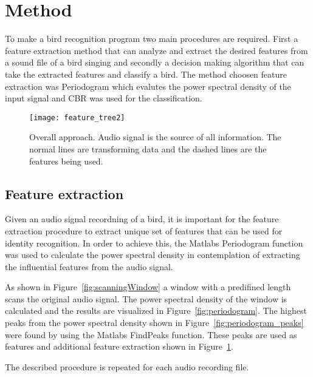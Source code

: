 \section{Method}
To make a bird recognition program two main procedures are required. First a feature
extraction method that can analyze and extract the desired features from a
sound file of a bird singing and secondly a decision making algorithm that can
take the extracted features and classify a bird. The method choosen feature
extraction was Periodogram which evalutes the power spectral density of the
input signal and CBR was used for the classification.

\begin{figure}[h]
\centering
\texttt{[image: feature\_tree2]}
\caption{Overall approach. Audio signal is the source of all information. The normal lines are transforming data and the dashed lines are the features being used.}
\label{fig:approach}
\end{figure}

\subsection{Feature extraction}
Given an audio signal recordning of a bird, it is important for the feature extraction
procedure to extract unique set of features that can be used for identity recognition.
In order to achieve this, the Matlabs Periodogram function was used to calculate the power
spectral density in contemplation of extracting the influential features from the audio signal.

As shown in Figure~\ref{fig:scanningWindow} a window with a predifined
length scans the original audio signal. The power spectral density of the window
is calculated and the results are visualized in Figure~\ref{fig:periodogram}.
The highest peaks from the power spectral density shown in Figure~\ref{fig:periodogram_peaks} were found
by using the Matlabs FindPeaks function. These peaks are used as features and additional feature extraction shown in Figure~\ref{fig:approach}.

The described procedure is repeated for each audio recording file.

